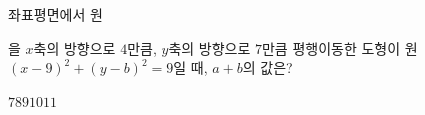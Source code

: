 좌표평면에서 원 \par\smallskip{}\par\smallskip\noindent 을 $x$축의 방향으로 $4$만큼, $y$축의 방향으로 $7$만큼 평행이동한 도형이 원~$(x-9)^2+(y-b)^2=9$일 때, $a+b$의 값은? 
\begin{choices32}{$7$}{$8$}{$9$}{$10$}{$11$}\end{choices32}
